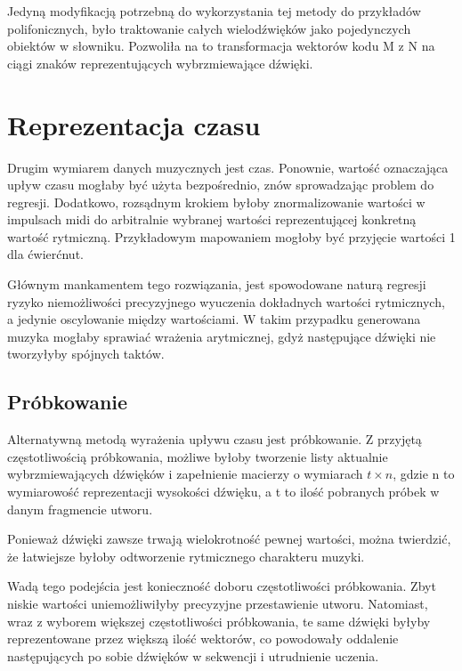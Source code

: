 {{{            Jedyną modyfikacją potrzebną do wykorzystania tej metody do przykładów polifonicznych, było traktowanie 
            całych wielodźwięków jako pojedynczych obiektów w\,\,słowniku. Pozwoliła na to transformacja wektorów kodu 
            M\,\,z N\,\,na ciągi znaków reprezentujących wybrzmiewające dźwięki.
        }
    }

    \section{Reprezentacja czasu}
    {
        Drugim wymiarem danych muzycznych jest czas. Ponownie, wartość oznaczająca upływ czasu
        mogłaby być użyta bezpośrednio, znów sprowadzając problem do regresji. Dodatkowo, rozsądnym krokiem
        byłoby znormalizowanie wartości w\,\,impulsach midi do arbitralnie wybranej wartości reprezentującej konkretną
        wartość rytmiczną. Przykładowym mapowaniem mogłoby być przyjęcie wartości 1 dla ćwierćnut.

        Głównym mankamentem tego rozwiązania, jest spowodowane naturą regresji ryzyko niemożliwości precyzyjnego wyuczenia 
        dokładnych wartości rytmicznych, a\,\,jedynie oscylowanie między wartościami. W\,\,takim przypadku generowana muzyka
        mogłaby sprawiać wrażenia arytmicznej, gdyż następujące dźwięki nie tworzyłyby spójnych taktów. 

        \subsection{Próbkowanie}
        {
            Alternatywną metodą wyrażenia upływu czasu jest próbkowanie. Z\,\,przyjętą częstotliwością próbkowania, 
            możliwe byłoby tworzenie listy aktualnie wybrzmiewających dźwięków i\,\,zapełnienie macierzy o\,\,wymiarach \(t \times n\), gdzie n\,\,to
            wymiarowość reprezentacji wysokości dźwięku, a\,\,t to ilość pobranych próbek w\,\,danym fragmencie utworu.
            
            Ponieważ dźwięki zawsze trwają wielokrotność pewnej wartości, można twierdzić, że łatwiejsze byłoby 
            odtworzenie rytmicznego charakteru muzyki.
            
            Wadą tego podejścia jest konieczność doboru częstotliwości próbkowania. Zbyt niskie wartości 
            uniemożliwiłyby precyzyjne przestawienie utworu. Natomiast, wraz z\,\,wyborem większej częstotliwości próbkowania,
            te same dźwięki byłyby reprezentowane przez większą ilość wektorów, 
            co powodowały oddalenie następujących po sobie dźwięków w\,\,sekwencji i\,\,utrudnienie uczenia.
        }

}}
